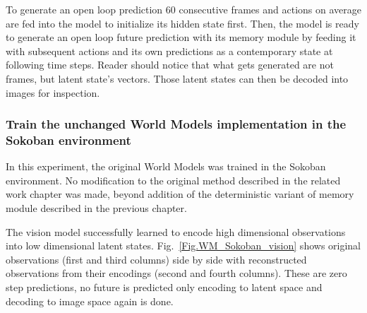 To generate an open loop prediction 60 consecutive frames and actions on average are fed into the model to initialize its hidden state first. Then, the model is ready to generate an open loop future prediction with its memory module by feeding it with subsequent actions and its own predictions as a contemporary state at following time steps. Reader should notice that what gets generated are not frames, but latent state's vectors. Those latent states can then be decoded into images for inspection.

\subsubsection{Train the unchanged World Models implementation in the Sokoban environment}

In this experiment, the original World Models was trained in the Sokoban environment. No modification to the original method described in the related work chapter was made, beyond addition of the deterministic variant of memory module described in the previous chapter.

The vision model successfully learned to encode high dimensional observations into low dimensional latent states. Fig.~\ref{Fig.WM_Sokoban_vision} shows original observations (first and third columns) side by side with reconstructed observations from their encodings (second and fourth columns). These are zero step predictions, no future is predicted only encoding to latent space and decoding to image space again is done.

